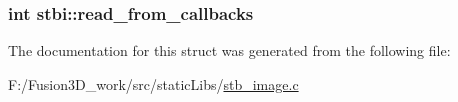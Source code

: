 \subsubsection[{read\+\_\+from\+\_\+callbacks}]{\setlength{\rightskip}{0pt plus 5cm}int stbi\+::read\+\_\+from\+\_\+callbacks}\label{structstbi_acb201cc1b3eb134f342cee89f5d11e70}


The documentation for this struct was generated from the following file\+:\begin{DoxyCompactItemize}
\item 
F\+:/\+Fusion3\+D\+\_\+work/src/static\+Libs/\hyperlink{stb__image_8c}{stb\+\_\+image.\+c}\end{DoxyCompactItemize}
